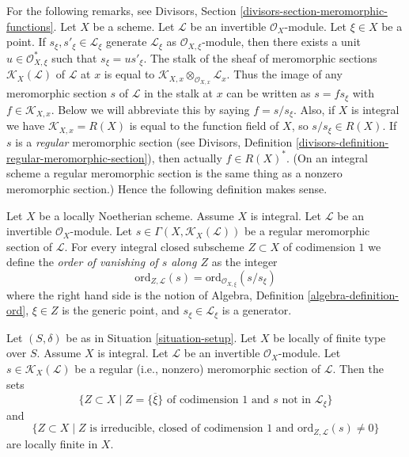 \noindent
For the following remarks, see
Divisors, Section \ref{divisors-section-meromorphic-functions}.
Let $X$ be a scheme.
Let $\mathcal{L}$ be an invertible $\mathcal{O}_X$-module.
Let $\xi \in X$ be a point.
If $s_\xi, s'_\xi \in \mathcal{L}_\xi$ generate $\mathcal{L}_\xi$
as $\mathcal{O}_{X, \xi}$-module, then there exists a unit
$u \in \mathcal{O}_{X, \xi}^*$ such that $s_\xi = u s'_\xi$.
The stalk of the sheaf of meromorphic sections
$\mathcal{K}_X(\mathcal{L})$ of $\mathcal{L}$
at $x$ is equal to
$\mathcal{K}_{X, x} \otimes_{\mathcal{O}_{X, x}} \mathcal{L}_x$.
Thus the image of any meromorphic section $s$
of $\mathcal{L}$ in the stalk at $x$ can be written as $s = fs_\xi$ with
$f \in \mathcal{K}_{X, x}$. Below we will abbreviate this by
saying $f = s/s_\xi$. Also, if $X$ is integral we have
$\mathcal{K}_{X, x} = R(X)$ is equal to the function field of $X$,
so $s/s_\xi \in R(X)$. If $s$ is a {\it regular} meromorphic
section (see
Divisors, Definition \ref{divisors-definition-regular-meromorphic-section}),
then actually $f \in R(X)^*$. (On an integral scheme a regular
meromorphic section is the same thing as a nonzero meromorphic section.)
Hence the following definition makes sense.

\begin{definition}
\label{definition-order-vanishing-meromorphic}
Let $X$ be a locally Noetherian scheme. Assume $X$ is integral.
Let $\mathcal{L}$ be an invertible $\mathcal{O}_X$-module.
Let $s \in \Gamma(X, \mathcal{K}_X(\mathcal{L}))$
be a regular meromorphic section of $\mathcal{L}$.
For every integral closed subscheme
$Z \subset X$ of codimension $1$ we define
the {\it order of vanishing of $s$ along $Z$} as the integer
$$
\text{ord}_{Z, \mathcal{L}}(s)
= \text{ord}_{\mathcal{O}_{X, \xi}}(s/s_\xi)
$$
where the right hand side is the notion of
Algebra, Definition \ref{algebra-definition-ord},
$\xi \in Z$ is the generic point,
and $s_\xi \in \mathcal{L}_\xi$ is a generator.
\end{definition}

\begin{lemma}
\label{lemma-divisor-meromorphic-locally-finite}
Let $(S, \delta)$ be as in Situation \ref{situation-setup}.
Let $X$ be locally of finite type over $S$. Assume $X$ is
integral. Let $\mathcal{L}$ be an invertible $\mathcal{O}_X$-module.
Let $s \in \mathcal{K}_X(\mathcal{L})$ be a regular (i.e., nonzero)
meromorphic section of $\mathcal{L}$. Then the sets
$$
\{Z \subset X \mid Z = \overline{\{\xi\}} \text{ of codimension }1
\text{ and }s\text{ not in }\mathcal{L}_\xi\}
$$
and
$$
\{Z \subset X \mid Z \text{ is irreducible, closed of codimension }1
\text{ and }\text{ord}_{Z, \mathcal{L}}(s) \not = 0\}
$$
are locally finite in $X$.
\end{lemma}

